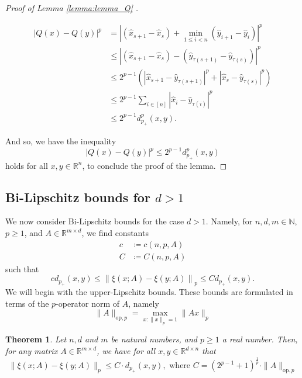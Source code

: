 \documentclass{amsart}
\theoremstyle{plain}
\newtheorem{theorem}{Theorem}
\theoremstyle{definition}
\theoremstyle{remark}
\newcommand{\RR}{\mathbb{R}}
\newcommand{\NN}{\mathbb{N}}
\newcommand{\abs}[1]{\left\lvert#1\right\rvert}
\begin{document}
\begin{proof}[Proof of Lemma \ref{lemma:lemma_Q} ]
\begin{enumerate}
        \begin{equation}
        \begin{split}
            \abs{Q(x) - Q(y)}^p &= \abs{\left(\hat{x}_{s+1} - \hat{x}_s\right) + \min_{1 \leq i < n}{\left(\hat{y}_{i+1} - \hat{y}_i\right)}}^p  \\
            &\leq  \abs{\left(\hat{x}_{s+1} - \hat{x}_s\right) - \left(\hat{y}_{\tau(s+1)} - \hat{y}_{\tau(s)}\right)}^p \\
            &\leq 2^{p - 1}\left(\abs{\hat{x}_{s+1} - \hat{y}_{\tau(s+1)}}^p + \abs{\hat{x}_s - \hat{y}_{\tau(s)}}^p \right)  \\
            &\leq 2^{p - 1}\sum_{i \in [n]}{\abs{\hat{x}_i - \hat{y}_{\tau(i)}}^p}  
 \\ &\leq 2^{p - 1}d^p_{p_+}(x, y).
        \end{split}
        \end{equation}
    \end{enumerate}
And so, we have the inequality
$$    \abs{Q(x) - Q(y)}^p \leq 2^{p - 1}d^p_{p_+}(x, y)
$$
holds for all $x, y \in \RR^n$, to conclude the proof of the lemma. 
\end{proof}


\subsection{Bi-Lipschitz bounds for $d>1$}
We now consider Bi-Lipschitz bounds for the case $d>1$.  Namely, for  $n, d ,m\in \NN$, $p \geq 1$, and $A \in \RR^{m \times d}$, we find constants
\begin{equation} \begin{split}
    c &\coloneq c(n, p, A) \\
    C &\coloneq C(n, p, A)
\end{split} \end{equation}
such that
\begin{equation}
    c d_{p_+}(x, y) \leq \left\|\xi\left(x ; A \right) - \xi\left(y ; A \right) \right\|_{p} \leq Cd_{p_+}(x, y).
\end{equation}
We will begin with the upper-Lipschitz bounds. These bounds are formulated in terms of the $p$-operator norm of $A$, namely
\begin{equation}
   \|A\|_{\text{op},p}=\max_{x: \|x\|_p=1} \|Ax\|_p  
\end{equation}
\begin{theorem} \label{theorem:F_a_bl_upper}
    Let $n, d$ and $m$ be natural numbers, and $p \geq 1$ a real number. Then, for any matrix $A \in \RR^{m \times d}$, we have   for all $x, y \in \RR^{d \times n}$ that
    \begin{equation}
        \|\xi\left(x ; A \right) - \xi\left(y ; A \right)\|_p \leq C \cdot d_{p_+}(x, y), \text{ where }  C = \left(2^{p-1} + 1\right)^{\frac{1}{p}}  \cdot \|A\|_{\text{op},p}
    \end{equation}
    \end{theorem}
\end{document}
